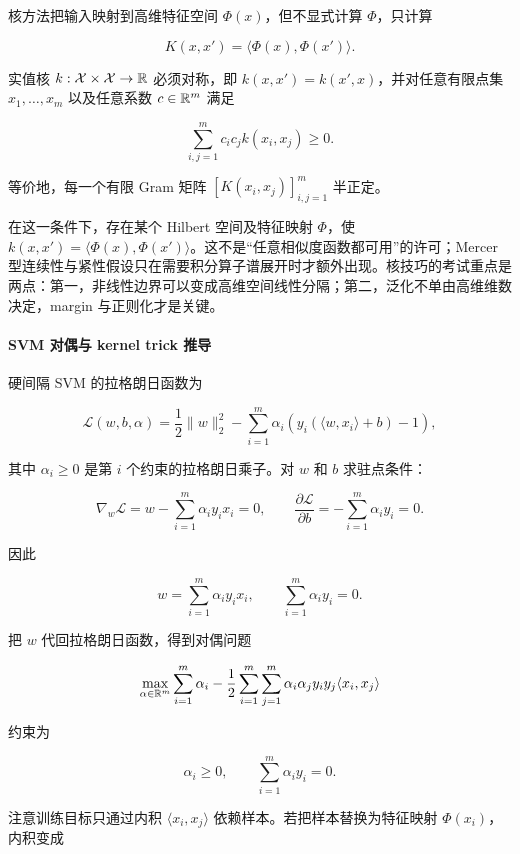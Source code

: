 \documentclass[11pt]{ctexart}
\begin{document}
核方法把输入映射到高维特征空间 \(\Phi(x)\)，但不显式计算 \(\Phi\)，只计算

\[
  K(x,x')=\langle \Phi(x),\Phi(x')\rangle.
\]

\begin{definition}[正定核]
实值核 \(k:\mathcal{X}\times\mathcal{X}\to\mathbb{R}\) 必须对称，即 \(k(x,x')=k(x',x)\)，并对任意有限点集 \(x_1,\ldots,x_m\) 以及任意系数 \(c\in\mathbb{R}^m\) 满足

\[
  \sum_{i,j=1}^{m}c_i c_j k(x_i,x_j)\ge 0.
\]

等价地，每一个有限 Gram 矩阵 \([K(x_i,x_j)]_{i,j=1}^{m}\) 半正定。
\end{definition}
在这一条件下，存在某个 Hilbert 空间及特征映射 \(\Phi\)，使 \(k(x,x')=\langle\Phi(x),\Phi(x')\rangle\)。这不是“任意相似度函数都可用”的许可；Mercer 型连续性与紧性假设只在需要积分算子谱展开时才额外出现。核技巧的考试重点是两点：第一，非线性边界可以变成高维空间线性分隔；第二，泛化不单由高维维数决定，margin 与正则化才是关键。

\paragraph{SVM 对偶与 kernel trick 推导}

硬间隔 SVM 的拉格朗日函数为

\[
  \mathcal{L}(w,b,\alpha)
  =
  \frac12\|w\|_2^2
  -
  \sum_{i=1}^{m}
  \alpha_i
  \left(
    y_i(\langle w,x_i\rangle+b)-1
  \right),
\]

其中 \(\alpha_i\ge0\) 是第 \(i\) 个约束的拉格朗日乘子。对 \(w\) 和 \(b\) 求驻点条件：

\[
  \nabla_w\mathcal{L}
  =
  w-\sum_{i=1}^{m}\alpha_i y_i x_i
  =
  0,
  \qquad
  \frac{\partial\mathcal{L}}{\partial b}
  =
  -\sum_{i=1}^{m}\alpha_i y_i
  =
  0.
\]

因此

\[
  w=\sum_{i=1}^{m}\alpha_i y_i x_i,
  \qquad
  \sum_{i=1}^{m}\alpha_i y_i=0.
\]

把 \(w\) 代回拉格朗日函数，得到对偶问题

\[
  \max_{\alpha\in\mathbb{R}^m}
  \sum_{i=1}^{m}\alpha_i
  -
  \frac12
  \sum_{i=1}^{m}
  \sum_{j=1}^{m}
  \alpha_i\alpha_j y_i y_j
  \langle x_i,x_j\rangle
\]

约束为

\[
  \alpha_i\ge0,
  \qquad
  \sum_{i=1}^{m}\alpha_i y_i=0.
\]

注意训练目标只通过内积 \(\langle x_i,x_j\rangle\) 依赖样本。若把样本替换为特征映射 \(\Phi(x_i)\)，内积变成
\end{document}
